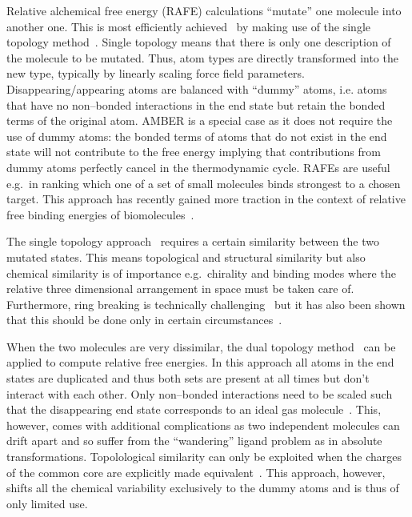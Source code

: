 \documentclass[journal=jctcce,manuscript=article]{achemso}
\begin{document}
Relative alchemical free energy (RAFE) calculations ``mutate'' one
molecule into another one.  This is most efficiently
achieved~\cite{doi:10.1021/j100056a020, Michel2010} by making use of
the single topology method~\cite{doi:10.1063/1.449208,
  doi:10.1021/j100056a020, doi:10.1021/jp981628n}.  Single topology
means that there is only one description of the molecule to be
mutated.  Thus, atom types are directly transformed into the new type,
typically by linearly scaling force field parameters.
Disappearing/appearing atoms are balanced with ``dummy'' atoms,
i.e. atoms that have no non--bonded interactions in the end state but
retain the bonded terms of the original atom.  AMBER is a special case
as it does not require the use of dummy atoms: the bonded terms of
atoms that do not exist in the end state will not contribute to the
free energy implying that contributions from dummy atoms perfectly
cancel in the thermodynamic cycle.  RAFEs are useful e.g.\ in ranking
which one of a set of small molecules binds strongest to a chosen
target.  This approach has recently gained more traction in the
context of relative free binding energies of
biomolecules~\cite{doi:10.1021/ja512751q}.

The single topology approach~\cite{doi:10.1021/j100056a020} requires a
certain similarity between the two mutated states.  This means
topological and structural similarity but also chemical similarity is
of importance e.g.\ chirality and binding modes where the relative
three dimensional arrangement in space must be taken care of.
Furthermore, ring breaking is technically
challenging~\cite{doi:10.1021/acs.jctc.6b00991} but it has also been
shown that this should be done only in certain
circumstances~\cite{doi:10.1021/acs.jcim.5b00057,
  doi:10.1021/jp994193s}.

When the two molecules are very dissimilar, the dual topology
method~\cite{doi:10.1021/j100056a020, doi:10.1021/jp981628n} can be
applied to compute relative free energies.  In this approach all atoms
in the end states are duplicated and thus both sets are present at all
times but don't interact with each other.  Only non--bonded
interactions need to be scaled such that the disappearing end state
corresponds to an ideal gas molecule~\cite{doi:10.1021/jp981628n}.
This, however, comes with additional complications as two independent
molecules can drift apart and so suffer from the ``wandering'' ligand
problem as in absolute transformations\cite{GILSON19971047,
  doi:10.1021/jp0217839, deng_computations_2009}.  Topolological
similarity can only be exploited when the charges of the common core
are explicitly made equivalent~\cite{doi:10.1021/acs.jctc.5b00179}.
This approach, however, shifts all the chemical variability
exclusively to the dummy atoms and is thus of only limited use.
\end{document}
